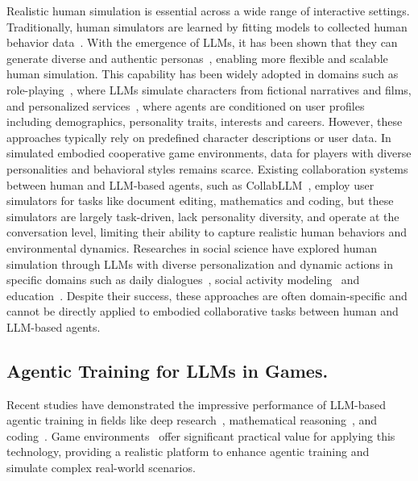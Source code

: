 \documentclass{article}
\theoremstyle{plain}
\theoremstyle{definition}
\theoremstyle{remark}
\begin{document}
Realistic human simulation is essential across a wide range of interactive settings. Traditionally, human simulators are learned by fitting models to collected human behavior data~\cite{CarrollSHGSAD19}. With the emergence of LLMs, it has been shown that they can generate diverse and authentic personas~\cite{kosinski2024evaluating,SalminenLPCHJ24,ShinHRLO24}, enabling more flexible and scalable human simulation. This capability has been widely adopted in domains such as role-playing~\cite{WangPQLZWGGN00024,TuFTSSGY24,0001WZY00YGC00X25}, where LLMs simulate characters from fictional narratives and films, and personalized services~\cite{SalemiMBZ24,jia2025ready,huang2025advancing}, where agents are conditioned on user profiles including demographics, personality traits, interests and careers. However, these approaches typically rely on predefined character descriptions or user data. In simulated embodied cooperative game environments, data for players with diverse personalities and behavioral styles remains scarce. Existing collaboration systems between human and LLM-based agents, such as CollabLLM~\cite{WuGP0LDC0L025}, employ user simulators for tasks like document editing, mathematics and coding, but these simulators are largely task-driven, lack personality diversity, and operate at the conversation level, limiting their ability to capture realistic human behaviors and environmental dynamics. Researches in social science have explored human simulation through LLMs with diverse personalization and dynamic actions in specific domains such as daily dialogues~\cite{WangYZQSBN024,zhang2025echo}, social activity modeling~\cite{ParkOCMLB23} and education~\cite{LiuYLC24}. Despite their success, these approaches are often domain-specific and cannot be directly applied to embodied collaborative tasks between human and LLM-based agents.

\subsection{Agentic Training for LLMs in Games.} 

Recent studies have demonstrated the impressive performance of LLM-based agentic training in fields like deep research~\cite{jin2025search}, mathematical reasoning~\cite{guo2025deepseek}, and coding~\cite{jiang2024survey}. Game environments~\cite{Chevalier-Boisvert19,CarrollSHGSAD19,ShridharYCBTH21,PuigSLWLTF021,WangX0MXZFA24} offer significant practical value for applying this technology, providing a realistic platform to enhance agentic training and simulate complex real-world scenarios.
\end{document}
